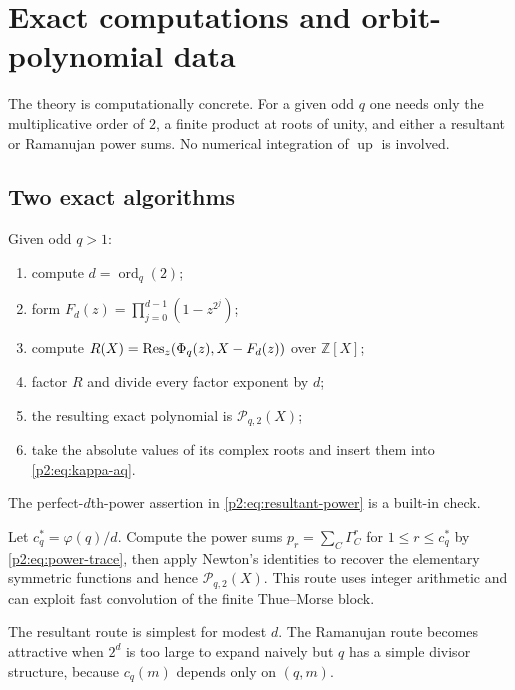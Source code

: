 \documentclass[11pt,oneside]{article}
\theoremstyle{definition}
\theoremstyle{remark}
\newcommand{\Z}{\mathbb Z}
\newcommand{\Up}{\operatorname{up}}
\newcommand{\ord}{\operatorname{ord}}
\begin{document}
\section{Exact computations and orbit-polynomial data}\label{p2:sec:computations}

The theory is computationally concrete. For a given odd $q$ one needs only the
multiplicative order of $2$, a finite product at roots of unity, and either a
resultant or Ramanujan power sums. No numerical integration of $\Up$ is involved.

\subsection{Two exact algorithms}

\begin{algorithm}\label{p2:alg:resultant}
Given odd $q>1$:
\begin{enumerate}
 \item compute $d=\ord_q(2)$;
 \item form $F_d(z)=\prod_{j=0}^{d-1}(1-z^{2^j})$;
 \item compute $R(X)=\operatorname{Res}_z(\Phi_q(z),X-F_d(z))$ over $\Z[X]$;
 \item factor $R$ and divide every factor exponent by $d$;
 \item the resulting exact polynomial is $\mathscr P_{q,2}(X)$;
 \item take the absolute values of its complex roots and insert them into
 \eqref{p2:eq:kappa-aq}.
\end{enumerate}
The perfect-$d$th-power assertion in \eqref{p2:eq:resultant-power} is a built-in check.
\end{algorithm}

\begin{algorithm}\label{p2:alg:ramanujan}
Let $c_q^*=\varphi(q)/d$. Compute the power sums
$p_r=\sum_C\Gamma_C^r$ for $1\le r\le c_q^*$ by \eqref{p2:eq:power-trace}, then apply
Newton's identities to recover the elementary symmetric functions and hence
$\mathscr P_{q,2}(X)$. This route uses integer arithmetic and can exploit fast
convolution of the finite Thue--Morse block.
\end{algorithm}

The resultant route is simplest for modest $d$. The Ramanujan route becomes
attractive when $2^d$ is too large to expand naively but $q$ has a simple divisor
structure, because $c_q(m)$ depends only on $(q,m)$.
\end{document}
